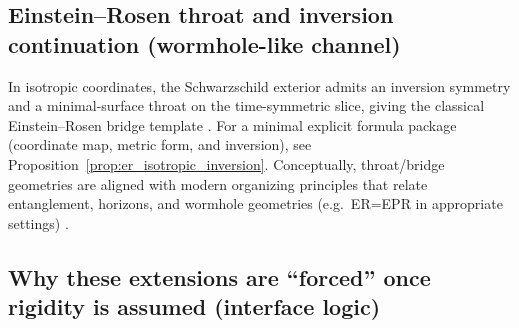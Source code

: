 \subsection{Einstein--Rosen throat and inversion continuation (wormhole-like channel)}
\label{app:wormhole_throat_pointer}

In isotropic coordinates, the Schwarzschild exterior admits an inversion symmetry and a minimal-surface throat on the time-symmetric slice, giving the classical Einstein--Rosen bridge template \cite{EinsteinRosen1935,Kruskal1960,Wald1984}.
For a minimal explicit formula package (coordinate map, metric form, and inversion), see Proposition~\ref{prop:er_isotropic_inversion}.
Conceptually, throat/bridge geometries are aligned with modern organizing principles that relate entanglement, horizons, and wormhole geometries (e.g.\ ER=EPR in appropriate settings) \cite{SusskindMaldacena2013}.

\subsection{Why these extensions are ``forced'' once rigidity is assumed (interface logic)}
\label{app:bh_wormholes_rigidity_logic}

